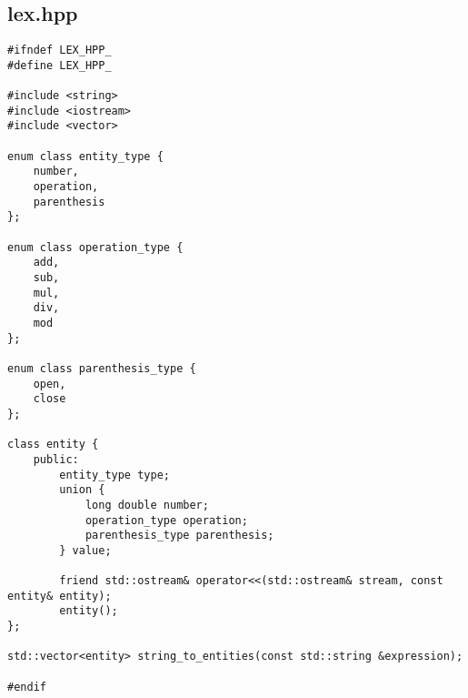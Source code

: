 \subsection{lex.hpp}
\begin{verbatim}
#ifndef LEX_HPP_
#define LEX_HPP_

#include <string>
#include <iostream>
#include <vector>

enum class entity_type {
    number,
    operation,
    parenthesis
};

enum class operation_type {
    add,
    sub,
    mul,
    div,
    mod
};

enum class parenthesis_type {
    open,
    close
};

class entity {
    public:
        entity_type type;
        union {
            long double number;
            operation_type operation;
            parenthesis_type parenthesis;
        } value;

        friend std::ostream& operator<<(std::ostream& stream, const entity& entity);
        entity();
};

std::vector<entity> string_to_entities(const std::string &expression);

#endif
\end{verbatim}

